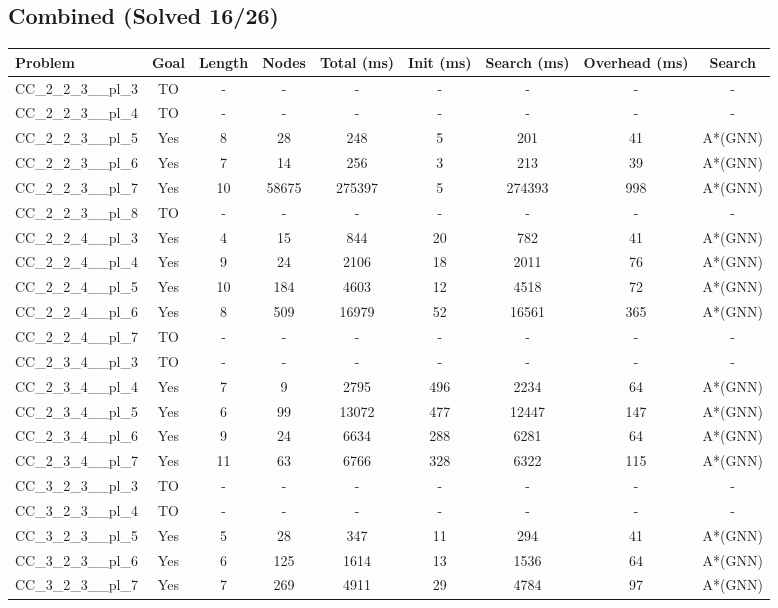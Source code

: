 \documentclass{article}
\begin{document}
\subsection*{Combined (Solved 16/26)}
\begin{tabular}{lcccccccc}
\toprule
Problem & Goal & Length & Nodes & Total (ms) & Init (ms) & Search (ms) & Overhead (ms) & Search \\
\midrule
CC\_2\_2\_3\_\_pl\_3 & TO & - & - & - & - & - & - & - \\
CC\_2\_2\_3\_\_pl\_4 & TO & - & - & - & - & - & - & - \\
CC\_2\_2\_3\_\_pl\_5 & Yes & 8 & 28 & 248 & 5 & 201 & 41 & A*(GNN) \\
CC\_2\_2\_3\_\_pl\_6 & Yes & 7 & 14 & 256 & 3 & 213 & 39 & A*(GNN) \\
CC\_2\_2\_3\_\_pl\_7 & Yes & 10 & 58675 & 275397 & 5 & 274393 & 998 & A*(GNN) \\
CC\_2\_2\_3\_\_pl\_8 & TO & - & - & - & - & - & - & - \\
CC\_2\_2\_4\_\_pl\_3 & Yes & 4 & 15 & 844 & 20 & 782 & 41 & A*(GNN) \\
CC\_2\_2\_4\_\_pl\_4 & Yes & 9 & 24 & 2106 & 18 & 2011 & 76 & A*(GNN) \\
CC\_2\_2\_4\_\_pl\_5 & Yes & 10 & 184 & 4603 & 12 & 4518 & 72 & A*(GNN) \\
CC\_2\_2\_4\_\_pl\_6 & Yes & 8 & 509 & 16979 & 52 & 16561 & 365 & A*(GNN) \\
CC\_2\_2\_4\_\_pl\_7 & TO & - & - & - & - & - & - & - \\
CC\_2\_3\_4\_\_pl\_3 & TO & - & - & - & - & - & - & - \\
CC\_2\_3\_4\_\_pl\_4 & Yes & 7 & 9 & 2795 & 496 & 2234 & 64 & A*(GNN) \\
CC\_2\_3\_4\_\_pl\_5 & Yes & 6 & 99 & 13072 & 477 & 12447 & 147 & A*(GNN) \\
CC\_2\_3\_4\_\_pl\_6 & Yes & 9 & 24 & 6634 & 288 & 6281 & 64 & A*(GNN) \\
CC\_2\_3\_4\_\_pl\_7 & Yes & 11 & 63 & 6766 & 328 & 6322 & 115 & A*(GNN) \\
CC\_3\_2\_3\_\_pl\_3 & TO & - & - & - & - & - & - & - \\
CC\_3\_2\_3\_\_pl\_4 & TO & - & - & - & - & - & - & - \\
CC\_3\_2\_3\_\_pl\_5 & Yes & 5 & 28 & 347 & 11 & 294 & 41 & A*(GNN) \\
CC\_3\_2\_3\_\_pl\_6 & Yes & 6 & 125 & 1614 & 13 & 1536 & 64 & A*(GNN) \\
CC\_3\_2\_3\_\_pl\_7 & Yes & 7 & 269 & 4911 & 29 & 4784 & 97 & A*(GNN) \\

\end{tabular}
\end{document}
